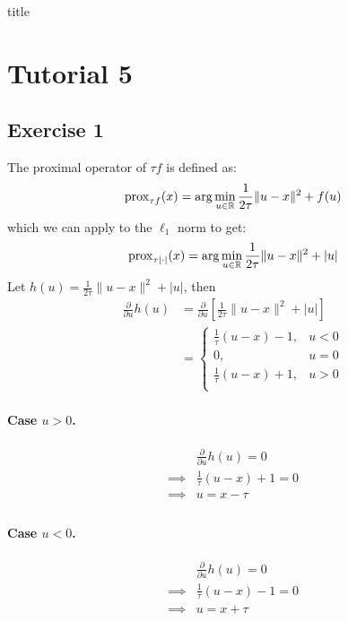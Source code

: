 \documentclass[12pt]{article}
\newcommand{\prox}{\operatorname{prox}}
\begin{document}
{title}

\tableofcontents




\section{Tutorial 5}
\subsection{Exercise 1}
The proximal operator of $\tau f$ is defined as:
\begin{equation}
  \prox_{\tau f}(x) = \arg\min_{u \in \R} \frac{1}{2\tau}\|u-x\|^2 + f(u)
\end{equation}
which we can apply to the $\ell_1$ norm to get:
\begin{equation}
  \prox_{\tau |\cdot|}(x) = \arg\min_{u \in \R} \frac{1}{2\tau}\|u-x\|^2 + |u|
\end{equation}
Let $h(u) = \frac{1}{2\tau}\|u-x\|^2 + |u|$, then
\begin{align*}
  \frac{\partial}{\partial u} h(u)
   & = \frac{\partial}{\partial u}  \left[\frac{1}{2\tau}\|u-x\|^2 + |u| \right] \\
   & =
  \begin{cases}
    \frac{1}{\tau}(u-x) - 1,  & u < 0 \\
    0,                        & u = 0 \\
    \frac{1}{\tau} (u-x) + 1, & u > 0 \\
  \end{cases}
\end{align*}

\paragraph{Case $u > 0$.}
\begin{align*}
           &
  \frac{\partial}{\partial u}  h(u) = 0 \\
  \implies &
  \frac{1}{\tau} (u-x) + 1 = 0          \\
  \implies &
  u = x - \tau                          \\
\end{align*}

\paragraph{Case $u < 0$.}
\begin{align*}
           &
  \frac{\partial}{\partial u}  h(u) = 0 \\
  \implies &
  \frac{1}{\tau} (u-x) - 1 = 0          \\
  \implies &
  u = x + \tau                          \\
\end{align*}
\end{document}
